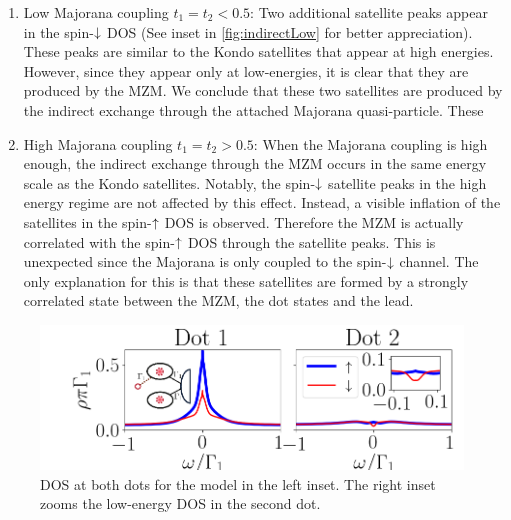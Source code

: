 \begin{enumerate}
 \item Low Majorana coupling $t_1=t_2 < 0.5$: Two additional satellite peaks appear in the spin-$\downarrow$ DOS (See inset in \ref{fig:indirectLow} for better appreciation). These peaks are similar to the  Kondo satellites that appear at high energies. However, since they appear only at low-energies, it is clear that they are produced by the MZM. We conclude that these two satellites are produced by the indirect exchange through the attached  Majorana quasi-particle. These  
 \item High Majorana coupling $t_1=t_2 > 0.5$: When the Majorana coupling is high enough, the indirect exchange through the MZM occurs in the same energy scale as the Kondo satellites. Notably, the spin-$\downarrow$ satellite peaks in the high energy regime are not affected by this effect. Instead, a visible inflation of the satellites in the spin-$\uparrow$ DOS is observed. Therefore the MZM is actually correlated with the spin-$\uparrow$ DOS through the satellite peaks. This is unexpected since the Majorana is only coupled to the spin-$\downarrow$ channel.  The only explanation for this is that these satellites are formed by a strongly correlated state between the MZM, the dot states and the lead. 
\end{enumerate}
\begin{figure}[h]
\centering
\includegraphics[scale=0.5]{IMAGES/NRG/IND.png}
\caption{\label{fig:IND} DOS at both dots for the model in the left inset. The right inset zooms the low-energy DOS in the second dot.\protect{} }
\end{figure} 




